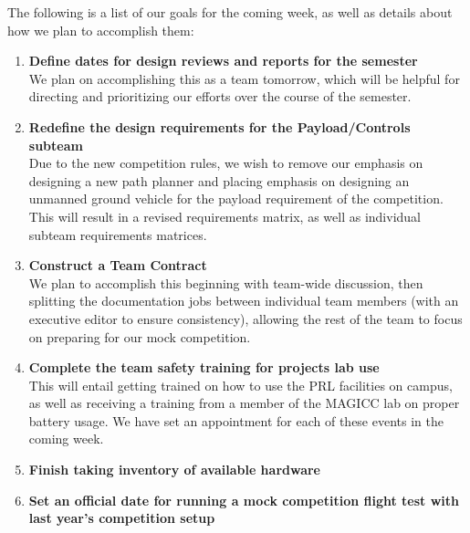 \documentclass[]{../auvsi_doc}
\begin{document}
The following is a list of our goals for the coming week, as well as details about how we plan to accomplish them:

\begin{enumerate}
\item \textbf{Define dates for design reviews and reports for the semester}\\
We plan on accomplishing this as a team tomorrow, which will be helpful for directing and prioritizing our efforts over the course of the semester.
\item \textbf{Redefine the design requirements for the Payload/Controls subteam}\\
Due to the new competition rules, we wish to remove our emphasis on designing a new path planner and placing emphasis on designing an unmanned ground vehicle for the payload requirement of the competition. This will result in a revised requirements matrix, as well as individual subteam requirements matrices.
\item \textbf{Construct a Team Contract}\\
We plan to accomplish this beginning with team-wide discussion, then splitting the documentation jobs between individual team members (with an executive editor to ensure consistency), allowing the rest of the team to focus on preparing for our mock competition.
\item \textbf{Complete the team safety training for projects lab use}\\
This will entail getting trained on how to use the PRL facilities on campus, as well as receiving a training from a member of the MAGICC lab on proper battery usage. We have set an appointment for each of these events in the coming week.
\item \textbf{Finish taking inventory of available hardware}
\item \textbf{Set an official date for running a mock competition flight test with last year's competition setup}
\end{enumerate}
\end{document}
